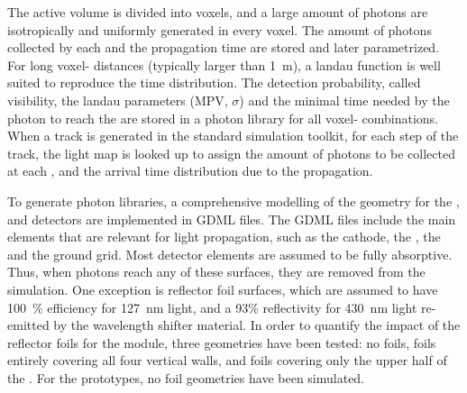 The active volume is divided into voxels, and a large amount of photons are isotropically and uniformly generated in every voxel. The amount of photons collected by each  and the propagation time are stored and later parametrized. For long voxel- distances (typically larger than \SI{1}{\m}), a landau function is well suited to reproduce the time distribution. The detection probability, called visibility, the landau parameters (MPV, $\sigma$) and the minimal time needed by the photon to reach the  are stored in a photon library for all voxel- combinations. When a track is generated in the standard \dual {} simulation toolkit, for each step of the track, the light map is looked up to assign the amount of photons to be collected at each , and the arrival time distribution due to the propagation. 

To generate photon libraries, a comprehensive modelling of the geometry for the ,  and   detectors are implemented in GDML files. The GDML files include the main elements that are relevant for light propagation, such as the cathode, the , the  and the ground grid. Most detector elements are assumed to be fully absorptive. Thus, when photons reach any of these surfaces, they are removed from the simulation. One exception is  reflector foil surfaces, which are assumed to have \SI{100}{\%}  efficiency for \SI{127}{\nm}  light, and a 93\% reflectivity for \SI{430}{\nm} light re-emitted by the wavelength shifter material. In order to quantify the impact of the  reflector foils for the   module, three geometries have been tested: no foils, foils entirely covering all four  vertical walls, and foils covering only the upper half of the . For the  prototypes, no foil geometries have been simulated.

